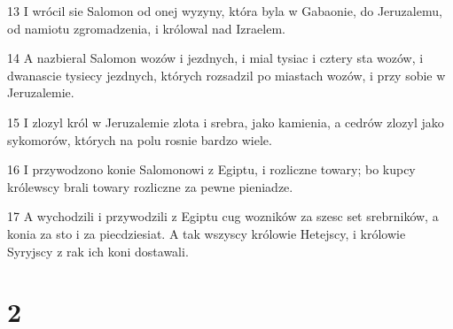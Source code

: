 \par 13 I wrócil sie Salomon od onej wyzyny, która byla w Gabaonie, do Jeruzalemu, od namiotu zgromadzenia, i królowal nad Izraelem.
\par 14 A nazbieral Salomon wozów i jezdnych, i mial tysiac i cztery sta wozów, i dwanascie tysiecy jezdnych, których rozsadzil po miastach wozów, i przy sobie w Jeruzalemie.
\par 15 I zlozyl król w Jeruzalemie zlota i srebra, jako kamienia, a cedrów zlozyl jako sykomorów, których na polu rosnie bardzo wiele.
\par 16 I przywodzono konie Salomonowi z Egiptu, i rozliczne towary; bo kupcy królewscy brali towary rozliczne za pewne pieniadze.
\par 17 A wychodzili i przywodzili z Egiptu cug wozników za szesc set srebrników, a konia za sto i za piecdziesiat. A tak wszyscy królowie Hetejscy, i królowie Syryjscy z rak ich koni dostawali.

\chapter{2}

